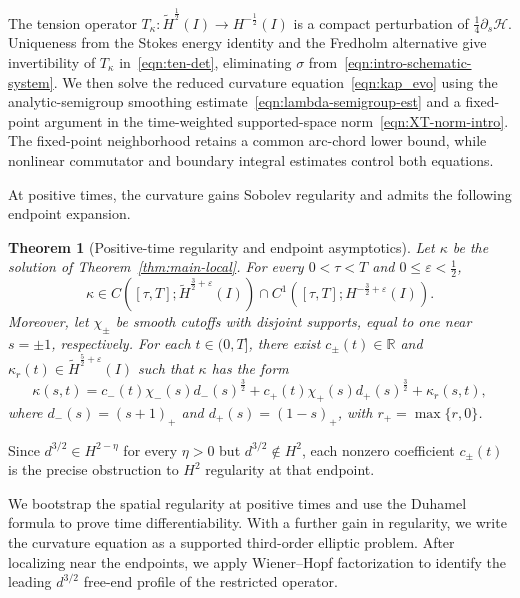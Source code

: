 \documentclass[11pt,reqno]{amsart}
\theoremstyle{plain}
\newtheorem{theorem}{Theorem}[section]
\theoremstyle{definition}
\numberwithin{equation}{section}
\newcommand{\paren}[1]{\left(#1\right)}
\newcommand{\p}{\partial}
\newcommand{\mc}[1]{\mathcal{#1}}
\newcommand{\wt}[1]{\widetilde{#1}}
\newcommand{\R}{\mathbb{R}}
\newcommand{\hi}[1]{H^{#1}(I)}
\newcommand{\thi}[1]{\wt H^{#1}(I)}
\begin{document}
The tension operator $T_\kappa:\thi{\frac12}\to\hi{-\frac12}$ is a
compact perturbation of $\frac14\p_s\mc H$. Uniqueness from the Stokes
energy identity and the Fredholm alternative give invertibility of
$T_\kappa$ in~\eqref{eqn:ten-det}, eliminating $\sigma$ from~\eqref{eqn:intro-schematic-system}.
We then solve the reduced curvature equation~\eqref{eqn:kap_evo} using the
analytic-semigroup smoothing estimate~\eqref{eqn:lambda-semigroup-est}
and a fixed-point argument in the time-weighted supported-space
norm~\eqref{eqn:XT-norm-intro}. The fixed-point neighborhood retains a
common arc-chord lower bound, while nonlinear commutator and boundary
integral estimates control both equations.

At positive times, the curvature gains Sobolev regularity and admits the
following endpoint expansion.

\begin{theorem}[Positive-time regularity and endpoint asymptotics]
\label{thm:main-regularity}
Let $\kappa$ be the solution of Theorem~\ref{thm:main-local}.
For every $0<\tau<T$ and $0\le\varepsilon<\frac12$,
\begin{equation}\label{eqn:main-positive-time-regularity}
    \kappa\in C\paren{[\tau,T];\thi{\frac32+\varepsilon}}
    \cap C^1\paren{[\tau,T];\hi{-\frac32+\varepsilon}}.
\end{equation}
Moreover, let $\chi_\pm$ be smooth cutoffs with disjoint supports, equal
to one near $s=\pm1$, respectively. For each $t\in(0,T]$, there exist
$c_\pm(t)\in\R$ and
$\kappa_r(t)\in\thi{\frac52+\varepsilon}$ such that $\kappa$ has the form
\begin{equation}\label{eqn:main-endpoint-split}
    \kappa(s,t)
    =c_-(t)\chi_-(s)d_-(s)^{\frac32}
     +c_+(t)\chi_+(s)d_+(s)^{\frac32}
     +\kappa_r(s,t),
\end{equation}
where $d_-(s)=(s+1)_+$ and $d_+(s)=(1-s)_+$, with $r_+=\max\{r,0\}$.
\end{theorem}

Since $d^{3/2}\in H^{2-\eta}$ for every $\eta>0$ but $d^{3/2}\notin H^2$, each nonzero coefficient $c_\pm(t)$ is the precise obstruction to $H^2$ regularity at that endpoint.

We bootstrap the spatial regularity at positive times and use the Duhamel
formula to prove time differentiability. With a further gain in regularity,
we write the curvature equation as a supported third-order elliptic problem.
After localizing near the endpoints, we apply Wiener--Hopf factorization
to identify the leading $d^{3/2}$ free-end profile of the restricted operator.
\end{document}
